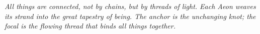 \textit{All things are connected, not by chains, but by threads of light. Each Aeon weaves its strand into the great tapestry of being. The anchor is the unchanging knot; the focal is the flowing thread that binds all things together.}

